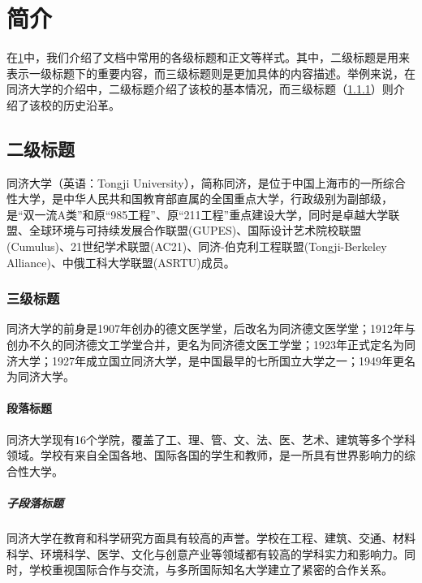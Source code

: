 \section{简介}\label{sec:introduction}

在\cref{sec:introduction}中，我们介绍了文档中常用的各级标题和正文等样式。其中，二级标题是用来表示一级标题下的重要内容，而三级标题则是更加具体的内容描述。举例来说，在同济大学的介绍中，二级标题介绍了该校的基本情况，而三级标题（\cref{subsec:third-level-title}）则介绍了该校的历史沿革。


\subsection{二级标题}

同济大学（英语：Tongji University），简称同济，是位于中国上海市的一所综合性大学，是中华人民共和国教育部直属的全国重点大学，行政级别为副部级，是“双一流A类”和原“985工程”、原“211工程”重点建设大学，同时是卓越大学联盟、全球环境与可持续发展合作联盟(GUPES)、国际设计艺术院校联盟(Cumulus)、21世纪学术联盟(AC21)、同济-伯克利工程联盟(Tongji-Berkeley Alliance)、中俄工科大学联盟(ASRTU)成员。

\subsubsection{三级标题}\label{subsec:third-level-title}

同济大学的前身是1907年创办的德文医学堂，后改名为同济德文医学堂；1912年与创办不久的同济德文工学堂合并，更名为同济德文医工学堂；1923年正式定名为同济大学；1927年成立国立同济大学，是中国最早的七所国立大学之一；1949年更名为同济大学。


\paragraph{段落标题}

同济大学现有16个学院，覆盖了工、理、管、文、法、医、艺术、建筑等多个学科领域。学校有来自全国各地、国际各国的学生和教师，是一所具有世界影响力的综合性大学。

\subparagraph{子段落标题}

同济大学在教育和科学研究方面具有较高的声誉。学校在工程、建筑、交通、材料科学、环境科学、医学、文化与创意产业等领域都有较高的学科实力和影响力。同时，学校重视国际合作与交流，与多所国际知名大学建立了紧密的合作关系。

